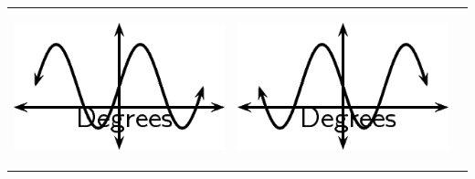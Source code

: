 \begin{center}
\begin{xtabular*}{\mytablewidth}[t]{|p{10\mystarwidth}|p{10\mystarwidth}|p{10\mystarwidth}|}
                  
    \setcounter{subfigure}{0}

\label{m39414*id85372}
    \begin{center}
    \label{m39414*id85372!!!underscore!!!media}\label{m39414*id85372!!!underscore!!!printimage}\includegraphics{col11306.imgs/m39414_MG10C15_019.png} %
        
      \vspace{2pt}
    \vspace{.1in}
    
    \end{center}



    \addtocounter{footnote}{-0}
    
                 &
    
    
        
                  
    \setcounter{subfigure}{0}

\label{m39414*id85384}
    \begin{center}
    \label{m39414*id85384!!!underscore!!!media}\label{m39414*id85384!!!underscore!!!printimage}\includegraphics{col11306.imgs/m39414_MG10C15_020.png} %
        
      \vspace{2pt}
    \vspace{.1in}
    

\end{center}
\end{xtabular*}
\end{center}
